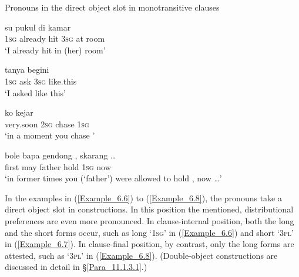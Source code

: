 \begin{styleExampleTitle}
Pronouns in the direct object slot in monotransitive clauses
\end{styleExampleTitle}

\ea
\label{Example_6.2}
 {su} {pukul} {} {di} {kamar}\\ %
 \textsc{1sg}  already  hit  \textsc{3sg}  at  room\\

\glt
‘I already hit  in (her) room’ \textstyleExampleSource{[081115-001a-Cv.0271]}
\z

\ea
\label{Example_6.3}
 {tanya} {} {begini}\\ %
 \textsc{1sg}  ask  \textsc{3sg}  like.this\\

\glt
‘I asked  like this’ \textstyleExampleSource{[081014-016-Cv.0001]}
\z

\ea
\label{Example_6.4}
 {ko} {kejar} {}\\ %
 very.soon  \textsc{2sg}  chase  \textsc{1sg}\\

\glt
‘in a moment you chase ’ \textstyleExampleSource{[080917-004-CVHT.0001]}
\z

\ea
\label{Example_6.5}
 {bole} {bapa} {gendong} {,} {skarang} {\ldots}\\ %
 first  may  father  hold  \textsc{1sg}  now  \\

 ‘in former times you (‘father’) were allowed to hold , now {\ldots}’ \textstyleExampleSource{[080922-001a-CvPh.0699]}
\z

In the examples in (\ref{Example_6.6}) to (\ref{Example_6.8}), the pronouns take a direct object slot in  constructions. In this position the mentioned, distributional preferences are even more pronounced. In clause-internal position, both the long and the short  forms occur, such as long  ‘\textsc{1sg}’ in (\ref{Example_6.6}) and short  ‘\textsc{3pl}’ in (\ref{Example_6.7}). In clause-final position, by contrast, only the long  forms are attested, such as  ‘\textsc{3pl}’ in (\ref{Example_6.8}). (Double-object constructions are discussed in detail in §\ref{Para_11.1.3.1}.)



